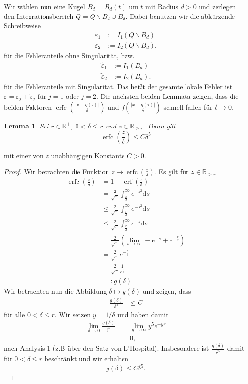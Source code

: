 \documentclass[12pt,a4paper]{scrartcl}
\newtheorem{Lemma}[Satz]{Lemma}
\newcommand{\dd}{\mathrm{d}}
\numberwithin{equation}{section}
\newcommand{\R}{\mathbb{R}} %
\newcommand{\erf}{\operatorname{erf}}
\newcommand{\erfc}{\operatorname{erfc}}
\begin{document}
Wir wählen nun eine Kugel $B_d=B_d(t)$ um $t$ mit Radius $d>0$ und zerlegen den Integrationsbereich $Q= Q \backslash B_d \cup B_d$. Dabei benutzen wir die abkürzende Schreibweise
\begin{align*}
\varepsilon_1&:=I_1(Q \backslash B_d) \\
\varepsilon_2&:=I_2(Q \backslash B_d).
\end{align*}
für die Fehleranteile ohne Singularität, bzw.
\begin{align*}
\widetilde \varepsilon_1&:=I_1(B_d) \\
\widetilde \varepsilon_2&:=I_2(B_d).
\end{align*}
für die Fehleranteile mit Singularität. Das heißt der gesamte lokale Fehler ist $\varepsilon =\varepsilon_j + \widetilde \varepsilon_j$ für $j=1$ oder $j=2$.
Die nächsten beiden Lemmata zeigen, dass die beiden Faktoren $\erfc\left(\frac{|x-\eta(\tau)|}{\delta}\right)$ und $f\left(\frac{|x-\eta(\tau)|}{\delta}\right)$ schnell fallen für $\delta \to 0$.
\begin{Lemma} \label{LErfOrdnung}
Sei  $r \in \R^+$, $0<\delta \leq r$  und $z \in \R_{\geq r}$. Dann gilt
\[
\erfc \left(\frac{z}{\delta} \right) \leq C \delta^5
\]
\end{Lemma}
mit einer von $z$ unabhängigen Konstante $C>0$.
\begin{proof}
Wir betrachten die Funktion $z \mapsto \erfc(\frac{z}{\delta})$. Es gilt für $z \in \R_{\geq r}$ 
\begin{align*}
\erfc \left(\frac{z}{\delta} \right)&= 1- \erf \left(\frac{z}{\delta}\right) \\
&= \frac{2}{\sqrt{\pi}}\int_{\frac{x}{\delta}}^\infty e^{-s^2} \dd s \\
&\leq \frac{2}{\sqrt{\pi}}\int_{\frac{r}{\delta}}^\infty e^{-s^2} \dd s \\
& \leq \frac{2}{\sqrt{\pi}}\int_{\frac{r}{\delta}}^\infty e^{-s} \dd s \\
&= \frac{2}{\sqrt{\pi}} \left(\lim_{s \to \infty}-e^{-s} + e^{-\frac{r}{\delta}} \right) \\
&= \frac{2}{\sqrt{\pi}} e^{-\frac{r}{\delta}} \\
&=\frac{2}{\sqrt{\pi}} \frac{1}{e^{\frac{r}{\delta}}} \\
&=: g(\delta)
\end{align*}
Wir betrachten nun die Abbildung $\delta \mapsto g(\delta)$ und zeigen, dass
\begin{align*}
\frac{g(\delta)}{\delta^5} &\leq C
\end{align*}
für alle $0<\delta\leq r$. Wir setzen $y=1/\delta$ und haben damit
\begin{align*}
\lim_{\delta \to 0} \frac{g(\delta)}{\delta^5} &= \lim_{y \to \infty} y^5 e^{-y r} \\
&= 0,
\end{align*}
nach Analysis 1 (z.B über den Satz von L'Hospital). Insbesondere ist $\frac{g(\delta)}{\delta^5}$ damit für $0<\delta \leq r$ beschränkt und wir erhalten
\[
g(\delta) \leq C \delta^5.
\]
\end{proof}
\end{document}
